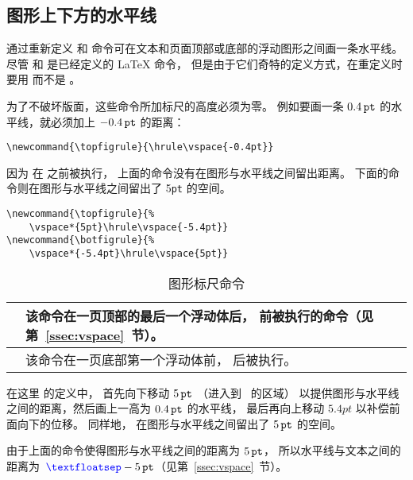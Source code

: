 \subsection{图形上下方的水平线}\label{ssec:fig-line}

通过重新定义  和  命令可在文本和页面顶部或底部的浮动图形之间画一条水平线。
尽管  和  是已经定义的 \LaTeX{} 命令，
但是由于它们奇特的定义方式，在重定义时要用  而不是 。

为了不破坏版面，这些命令所加标尺的高度必须为零。
例如要画一条 $0.4\,\mathtt{pt}$ 的水平线，就必须加上 $-0.4\,\mathtt{pt}$ 的距离：
\begin{lstlisting}
\newcommand{\topfigrule}{\hrule\vspace{-0.4pt}}
\end{lstlisting}
因为  在  之前被执行，
上面的命令没有在图形与水平线之间留出距离。
下面的命令则在图形与水平线之间留出了 5\texttt{pt} 的空间。
\begin{lstlisting}
\newcommand{\topfigrule}{% 
	\vspace*{5pt}\hrule\vspace{-5.4pt}} 
\newcommand{\botfigrule}{% 
	\vspace*{-5.4pt}\hrule\vspace{5pt}}
\end{lstlisting}

\begin{table}
	\centering
	\caption{图形标尺命令}\label{tab:figrulecmd}
	\kaishu
	\begin{tabular}{>{\ttfamily}l P{0.7\textwidth}}
		\toprule
		 & 该命令在一页顶部的最后一个浮动体后，
		 前被执行的命令（见第~\ref{ssec:vspace}~节）。 \\
		\hline
		 & 该命令在一页底部第一个浮动体前，
		 后被执行。\\
		\bottomrule
	\end{tabular}
\end{table}

在这里  的定义中，
首先向下移动 $5\,\mathtt{pt}$ （进入到~ 的区域）
以提供图形与水平线之间的距离，然后画上一高为 $0.4\,\mathtt{pt}$ 的水平线，
最后再向上移动 $5.4pt$ 以补偿前面向下的位移。
同样地， 在图形与水平线之间留出了 $5\,\mathtt{pt}$ 的空间。

由于上面的命令使得图形与水平线之间的距离为 $5\,\mathtt{pt}$，
所以水平线与文本之间的距离为~$\text{{\textcolor{blue}{\texttt{\textbackslash textfloatsep}}}}-5\,\mathtt{pt}$（见第~\ref{ssec:vspace}~节）。

